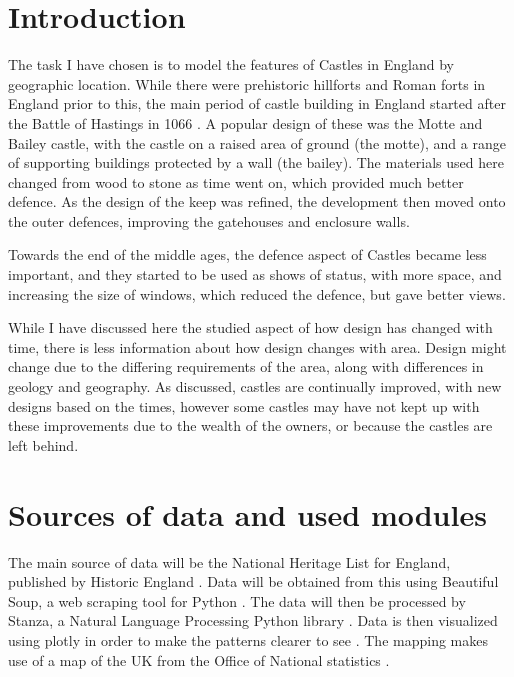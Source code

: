 \documentclass[12pt]{article}
\begin{document}
\maketitle

\section{Introduction}

The task I have chosen is to model the features of Castles in England by geographic location. While there were prehistoric hillforts and Roman forts in England prior to this, the main period of castle building in England started after the Battle of Hastings in 1066 \cite{RichardHodges1988OotE}. A popular design of these was the Motte and Bailey castle, with the castle on a raised area of ground (the motte), and a range of supporting buildings protected by a wall (the bailey). The materials used here changed from wood to stone as time went on, which provided much better defence. As the design of the keep was refined, the development then moved onto the outer defences, improving the gatehouses and enclosure walls.

Towards the end of the middle ages, the defence aspect of Castles became less important, and they started to be used as shows of status, with more space, and increasing the size of windows, which reduced the defence, but gave better views.

While I have discussed here the studied aspect of how design has changed with time, there is less information about how design changes with area. Design might change due to the differing requirements of the area, along with differences in geology and geography. As discussed, castles are continually improved, with new designs based on the times, however some castles may have not kept up with these improvements due to the wealth of the owners, or because the castles are left behind.


\section{Sources of data and used modules}

The main source of data will be the National Heritage List for England, published by Historic England \cite{nhle}. Data will be obtained from this using Beautiful Soup, a web scraping tool for Python \cite{bs}. The data will then be processed by Stanza, a Natural Language Processing Python library \cite{qi2020stanza}. Data is then visualized using plotly in order to make the patterns clearer to see \cite{plotly}. The mapping makes use of a map of the UK from the Office of National statistics \cite{ons}.
\end{document}
